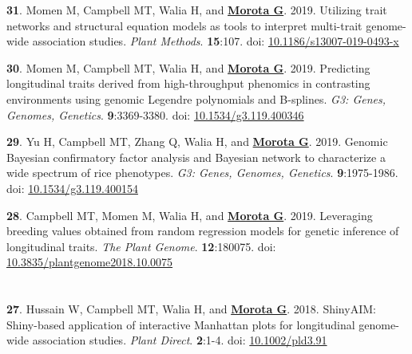 \documentclass[margin,line,10pt]{res}
\newenvironment{list1}{
  \begin{list}{\ding{113}}{%
      \setlength{\itemsep}{0in}
      \setlength{\parsep}{0in} \setlength{\parskip}{0in}
      \setlength{\topsep}{0in} \setlength{\partopsep}{0in} 
      \setlength{\leftmargin}{0.17in}}}{\end{list}}
\begin{document}
\begin{resume}
\begin{list1}
\item  [{\bf 31}.] Momen M, Campbell MT, Walia H, and \textbf{\underline{Morota G}}. 2019. Utilizing trait networks and structural equation models as tools to interpret multi-trait genome-wide association studies. \emph{Plant Methods}. \textbf{15}:107. doi: \textcolor{blue}{\href{https://doi.org/10.1186/s13007-019-0493-x}{10.1186/s13007-019-0493-x}}

     \vspace{0.5cm}
     
\item  [{\bf 30}.]  Momen M, Campbell MT, Walia H, and \textbf{\underline{Morota G}}. 2019. Predicting longitudinal traits derived from high-throughput phenomics in contrasting environments using genomic Legendre polynomials and B-splines. \emph{G3: Genes, Genomes, Genetics}. \textbf{9}:3369-3380.  doi: \textcolor{blue}{\href{https://doi.org/10.1534/g3.119.400346}{10.1534/g3.119.400346}}

     \vspace{0.5cm}

\item  [{\bf 29}.] Yu H, Campbell MT, Zhang Q, Walia H, and \textbf{\underline{Morota G}}. 2019. Genomic Bayesian confirmatory factor analysis and Bayesian network to characterize a wide spectrum of rice phenotypes. \emph{G3: Genes, Genomes, Genetics}. \textbf{9}:1975-1986. doi: \textcolor{blue}{\href{https://doi.org/10.1534/g3.119.400154}{10.1534/g3.119.400154}}

  \vspace{0.5cm}
  
\item  [{\bf 28}.] Campbell MT, Momen M, Walia H, and \textbf{\underline{Morota G}}. 2019. Leveraging breeding values obtained from random regression models for genetic inference of longitudinal traits. \emph{The Plant Genome}. \textbf{12}:180075. doi: \textcolor{blue}{\href{https://doi.org/10.3835/plantgenome2018.10.0075}{10.3835/plantgenome2018.10.0075}}

\end{list1}


\section{}
\begin{list1}

\item  [{\bf 27}.] Hussain W, Campbell MT, Walia H, and \textbf{\underline{Morota G}}. 2018. ShinyAIM: Shiny-based application of interactive Manhattan plots for longitudinal genome-wide association studies. \emph{Plant Direct}. \textbf{2}:1-4. doi: \textcolor{blue}{\href{https://doi.org/10.1002/pld3.91}{10.1002/pld3.91}}


\end{list1}
\end{resume}
\end{document}
